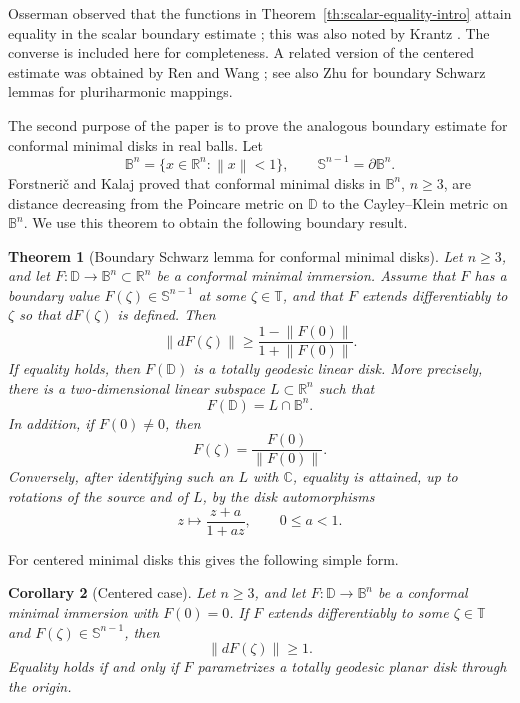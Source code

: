 \documentclass[11pt]{amsart}
\newtheorem{theorem}{Theorem}[section]
\newtheorem{corollary}[theorem]{Corollary}
\theoremstyle{definition}
\theoremstyle{remark}
\newcommand{\C}{\mathbb C}
\newcommand{\R}{\mathbb R}
\newcommand{\D}{\mathbb D}
\newcommand{\T}{\mathbb T}
\newcommand{\B}{\mathbb B}
\newcommand{\Sph}{\mathbb S}
\newcommand{\norm}[1]{\left\|#1\right\|}
\begin{document}
Osserman observed that the functions in Theorem~\ref{th:scalar-equality-intro} attain equality in the scalar boundary estimate \cite[Remark~2.2]{osserman2000}; this was also noted by Krantz \cite[Remark~5.2]{Stefan2011}. The converse is included here for completeness. A related version of the centered estimate was obtained by Ren and Wang \cite{RenWang2015}; see also Zhu \cite{Zhu2018} for boundary Schwarz lemmas for pluriharmonic mappings.

The second purpose of the paper is to prove the analogous boundary estimate for conformal minimal disks in real balls. Let
\[
        \B^n=\{x\in\R^n:\norm{x}<1\},
        \qquad
        \Sph^{n-1}=\partial\B^n.
\]
Forstneri\v c and Kalaj \cite{francdavid} proved that conformal minimal disks in \(\B^n\), \(n\ge3\), are distance decreasing from the Poincare metric on \(\D\) to the Cayley--Klein metric on \(\B^n\). We use this theorem to obtain the following boundary result.

\begin{theorem}[Boundary Schwarz lemma for conformal minimal disks]\label{th:minimal-main}
Let \(n\ge3\), and let \(F:\D\to\B^n\subset\R^n\) be a conformal minimal immersion. Assume that \(F\) has a boundary value \(F(\zeta)\in\Sph^{n-1}\) at some \(\zeta\in\T\), and that \(F\) extends differentiably to \(\zeta\) so that \(dF(\zeta)\) is defined. Then
\begin{equation}\label{eq:minimal-main-bound}
        \norm{dF(\zeta)}
        \ge
        \frac{1-\norm{F(0)}}{1+\norm{F(0)}}.
\end{equation}
If equality holds, then \(F(\D)\) is a totally geodesic linear disk. More precisely, there is a two-dimensional linear subspace \(L\subset\R^n\) such that
\[
        F(\D)=L\cap\B^n.
\]
In addition, if \(F(0)\ne0\), then
\[
        F(\zeta)=\frac{F(0)}{\norm{F(0)}}.
\]
Conversely, after identifying such an \(L\) with \(\C\), equality is attained, up to rotations of the source and of \(L\), by the disk automorphisms
\[
        z\longmapsto \frac{z+a}{1+az},
        \qquad 0\le a<1.
\]
\end{theorem}

For centered minimal disks this gives the following simple form.

\begin{corollary}[Centered case]\label{cor:centered-minimal-intro}
Let \(n\ge3\), and let \(F:\D\to\B^n\) be a conformal minimal immersion with \(F(0)=0\). If \(F\) extends differentiably to some \(\zeta\in\T\) and \(F(\zeta)\in\Sph^{n-1}\), then
\[
        \norm{dF(\zeta)}\ge1.
\]
Equality holds if and only if \(F\) parametrizes a totally geodesic planar disk through the origin.
\end{corollary}
\end{document}
